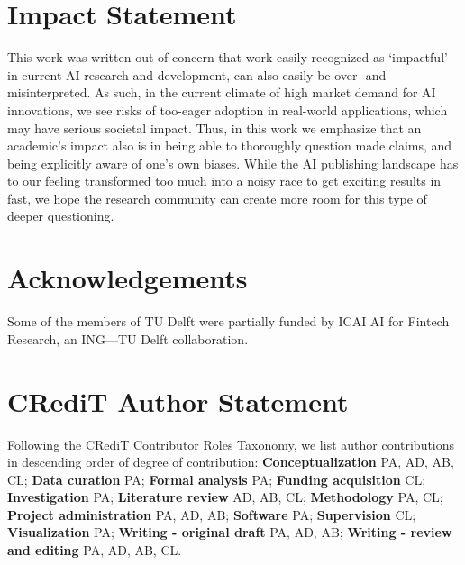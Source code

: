 \documentclass{article}
\theoremstyle{plain}
\theoremstyle{definition}
\theoremstyle{remark}
\begin{document}
\section*{Impact Statement}
This work was written out of concern that work easily recognized as `impactful' in current AI research and development, can also easily be over- and misinterpreted. As such, in the current climate of high market demand for AI innovations, we see risks of too-eager adoption in real-world applications, which may have serious societal impact. Thus, in this work we emphasize that an academic's impact also is in being able to thoroughly question made claims, and being explicitly aware of one's own biases. While the AI publishing landscape has to our feeling transformed too much into a noisy race to get exciting results in fast, we hope the research community can create more room for this type of deeper questioning.

\section*{Acknowledgements}

Some of the members of TU Delft were partially funded by ICAI AI for Fintech Research, an ING---TU Delft collaboration.

\section*{CRediT Author Statement}
Following the CRediT Contributor Roles Taxonomy, we list author contributions in descending order of degree of contribution: \textbf{Conceptualization} PA, AD, AB, CL; \textbf{Data curation} PA; \textbf{Formal analysis} PA; \textbf{Funding acquisition} CL; \textbf{Investigation} PA; \textbf{Literature review} AD, AB, CL; \textbf{Methodology} PA, CL; \textbf{Project administration} PA, AD, AB; \textbf{Software} PA; \textbf{Supervision} CL; \textbf{Visualization} PA; \textbf{Writing - original draft} PA, AD, AB; \textbf{Writing - review and editing} PA, AD, AB, CL.






\newpage
\appendix

\end{document}
